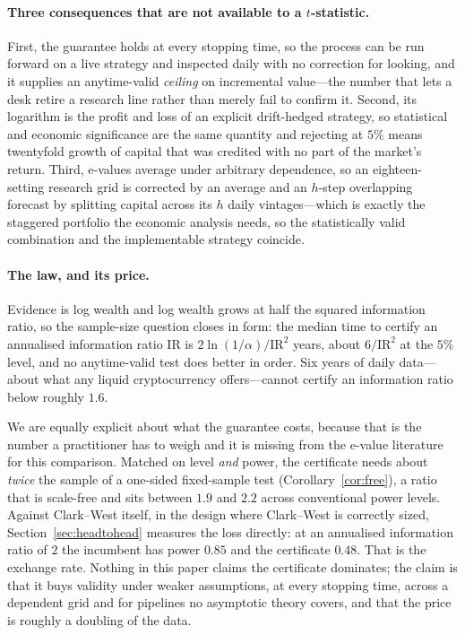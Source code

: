 \documentclass{article}
\theoremstyle{plain}
\theoremstyle{definition}
\begin{document}
\paragraph{Three consequences that are not available to a $t$-statistic.} First, the
guarantee holds at every stopping time, so the process can be run forward on a live strategy
and inspected daily with no correction for looking, and it supplies an anytime-valid
\emph{ceiling} on incremental value---the number that lets a desk retire a research line
rather than merely fail to confirm it. Second, its logarithm is the profit and loss of an
explicit drift-hedged strategy, so statistical and economic significance are the same
quantity and rejecting at $5\%$ means twentyfold growth of capital that was credited with no
part of the market's return. Third, e-values average under arbitrary dependence, so an
eighteen-setting research grid is corrected by an average and an $h$-step overlapping
forecast by splitting capital across its $h$ daily vintages---which is exactly the staggered
portfolio the economic analysis needs, so the statistically valid combination and the
implementable strategy coincide.

\paragraph{The law, and its price.} Evidence is log wealth and log wealth grows at half the
squared information ratio, so the sample-size question closes in form: the median time to
certify an annualised information ratio $\mathrm{IR}$ is $2\ln(1/\alpha)/\mathrm{IR}^2$ years,
about $6/\mathrm{IR}^2$ at the $5\%$ level, and no anytime-valid test does better in order.
Six years of daily data---about what any liquid cryptocurrency offers---cannot certify an
information ratio below roughly $1.6$.

We are equally explicit about what the guarantee costs, because that is the number a
practitioner has to weigh and it is missing from the e-value literature for this comparison.
Matched on level \emph{and} power, the certificate needs about \emph{twice} the sample of a
one-sided fixed-sample test (Corollary~\ref{cor:free}), a ratio that is scale-free and sits
between $1.9$ and $2.2$ across conventional power levels. Against Clark--West itself, in the
design where Clark--West is correctly sized, Section~\ref{sec:headtohead} measures the loss
directly: at an annualised information ratio of $2$ the incumbent has power $0.85$ and the
certificate $0.48$. That is the exchange rate. Nothing in this paper claims the certificate
dominates; the claim is that it buys validity under weaker assumptions, at every stopping
time, across a dependent grid and for pipelines no asymptotic theory covers, and that the
price is roughly a doubling of the data.
\end{document}
